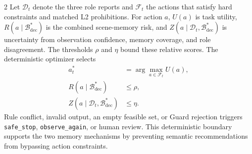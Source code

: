\documentclass[10pt]{article}
\newcommand{\code}[1]{\texttt{#1}}
\newcounter{algo}
\begin{document}
\begin{multicols}{2}
Let $\mathcal{D}_t$ denote the three role reports and $\mathcal{F}_t$ the actions that satisfy hard constraints and matched L2 prohibitions. For action $a$, $U(a)$ is task utility, $R(a\mid\mathcal{B}_{\mathrm{dec}}^*)$ is the combined scene-memory risk, and $Z(a\mid\mathcal{D}_t,\mathcal{B}_{\mathrm{dec}}^*)$ is uncertainty from observation confidence, memory coverage, and role disagreement. The thresholds $\rho$ and $\eta$ bound these relative scores. The deterministic optimizer selects
\begin{equation}
\begin{aligned}
a_t^*&=\arg\max_{a\in\mathcal{F}_t}U(a),\\
R(a\mid\mathcal{B}_{\mathrm{dec}}^*)&\leq\rho,\\
Z(a\mid\mathcal{D}_t,\mathcal{B}_{\mathrm{dec}}^*)&\leq\eta.
\end{aligned}
\label{eq:decision-en}
\end{equation}
Rule conflict, invalid output, an empty feasible set, or Guard rejection triggers \code{safe\_stop}, \code{observe\_again}, or human review. This deterministic boundary supports the two memory mechanisms by preventing semantic recommendations from bypassing action constraints.

\begin{center}
\end{center}

\end{multicols}
\end{document}
